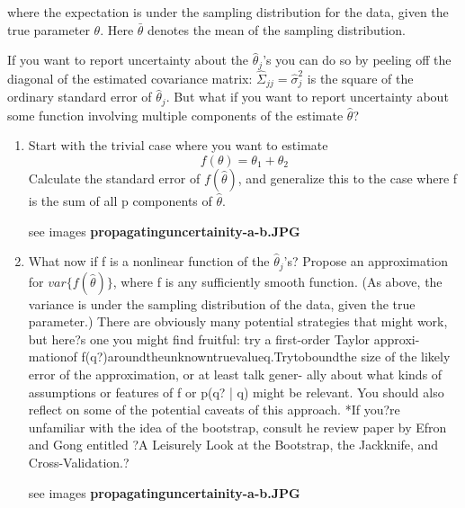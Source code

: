\documentclass{homework}
\begin{document}
where the expectation is under the sampling distribution for the data, given the true parameter $\theta$. Here $\bar{\theta}$ denotes the mean of the sampling distribution.
\par If you want to report uncertainty about the $\hat{\theta}_j$'s you can do so by peeling off the diagonal of the estimated covariance matrix: $\hat{\Sigma}_{jj} = \hat{\sigma}_j^2$ is the square of the ordinary standard error of $\hat{\theta}_j$. But what if you want to
report uncertainty about some function involving multiple components of the estimate $\hat{\theta}$?
\begin{enumerate}[label=(\Alph*)]

\item Start with the trivial case where you want to estimate 
$$f(\theta) = \theta_1 + \theta_2$$ 
Calculate the standard error of $f(\hat{\theta})$, and generalize this to the case where f is the sum of all p components of $\hat{\theta}$.

\par * see images \textbf{propagatinguncertainity-a-b.JPG}

\item What now if f is a nonlinear function of the $\hat{\theta}_j$'s? Propose an approximation for $var\{ f(\hat{\theta} )\}$, where f is any sufficiently smooth function. (As above, the variance is under the sampling distribution of the data, given the true parameter.)
There are obviously many potential strategies that might work, but here?s one you might find fruitful: try a first-order Taylor approxi- mationof f(q?)aroundtheunknowntruevalueq.Trytoboundthe size of the likely error of the approximation, or at least talk gener- ally about what kinds of assumptions or features of f or p(q? | q) might be relevant. You should also reflect on some of the potential caveats of this approach.  
*If you?re unfamiliar with the idea of the bootstrap, consult he review paper by Efron and Gong entitled ?A Leisurely Look at the Bootstrap, the Jackknife, and Cross-Validation.?  

\par * see images \textbf{propagatinguncertainity-a-b.JPG}
\end{enumerate}
\end{document}
